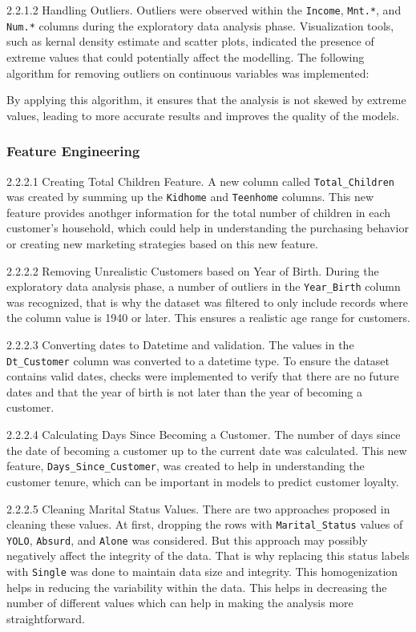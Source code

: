     2.2.1.2 Handling Outliers. Outliers were observed within the \texttt{Income}, \texttt{Mnt.*}, and \texttt{Num.*} columns during the exploratory data analysis phase. Visualization tools, such as kernal density estimate and scatter plots, indicated the presence of extreme values that could potentially affect the modelling. The following algorithm for removing outliers on continuous variables was implemented:


    By applying this algorithm, it ensures that the analysis is not skewed by extreme values, leading to more accurate results and improves the quality of the models.

\subsubsection{Feature Engineering}

    2.2.2.1 Creating Total Children Feature. A new column called \texttt{Total\_Children} was created by summing up the \texttt{Kidhome} and \texttt{Teenhome} columns. This new feature provides anothger information for the total number of children in each customer's household, which could help in understanding the purchasing behavior or creating new marketing strategies based on this new feature.

    2.2.2.2 Removing Unrealistic Customers based on Year of Birth. During the exploratory data analysis phase, a number of outliers in the \texttt{Year\_Birth} column was recognized, that is why the dataset was filtered to only include records where the column value is 1940 or later. This ensures a realistic age range for customers.

    2.2.2.3 Converting dates to Datetime and validation. The values in the \texttt{Dt\_Customer} column was converted to a datetime type. To ensure the dataset contains valid dates, checks were implemented to verify that there are no future dates and that the year of birth is not later than the year of becoming a customer.

    2.2.2.4 Calculating Days Since Becoming a Customer. The number of days since the date of becoming a customer up to the current date was calculated. This new feature, \texttt{Days\_Since\_Customer}, was created to help in understanding the customer tenure, which can be important in models to predict customer loyalty.

    2.2.2.5 Cleaning Marital Status Values. There are two approaches proposed in cleaning these values. At first, dropping the rows with \texttt{Marital\_Status} values of \texttt{YOLO}, \texttt{Absurd}, and \texttt{Alone} was considered. But this approach may possibly negatively affect the integrity of the data. That is why replacing this status labels with \texttt{Single} was done to maintain data size and integrity. This homogenization helps in reducing the variability within the data. This helps in decreasing the number of different values which can help in making the analysis more straightforward.

